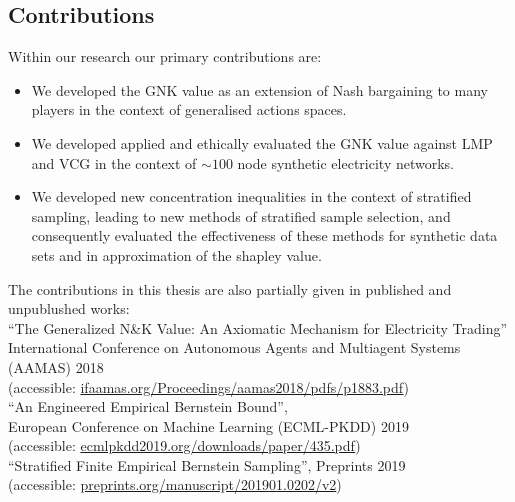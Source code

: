 \subsection{Contributions}

Within our research our primary contributions are:
\begin{itemize}
\item We developed the GNK value as an extension of Nash bargaining to many players in the context of generalised actions spaces.
\item We developed applied and ethically evaluated the GNK value against LMP and VCG in the context of $\sim 100$ node synthetic electricity networks.
\item We developed new concentration inequalities in the context of stratified sampling, leading to new methods of stratified sample selection, and consequently evaluated the effectiveness of these methods for synthetic data sets and in approximation of the shapley value.
\end{itemize}

The contributions in this thesis are also partially given in published and unpublushed works:\\

\noindent``The Generalized N\&K Value: An Axiomatic Mechanism for Electricity Trading''\\ International Conference on Autonomous Agents and Multiagent Systems\\ (AAMAS) 2018\\
(accessible: \href{ifaamas.org/Proceedings/aamas2018/pdfs/p1883.pdf}{ifaamas.org/Proceedings/aamas2018/pdfs/p1883.pdf})\\


\noindent``An Engineered Empirical Bernstein Bound'',\\ European Conference on Machine Learning (ECML-PKDD) 2019\\
(accessible: \href{http://ecmlpkdd2019.org/downloads/paper/435.pdf}{ecmlpkdd2019.org/downloads/paper/435.pdf})\\


\noindent``Stratified Finite Empirical Bernstein Sampling'', Preprints 2019\\
(accessible: \href{preprints.org/manuscript/201901.0202/v2}{preprints.org/manuscript/201901.0202/v2})


